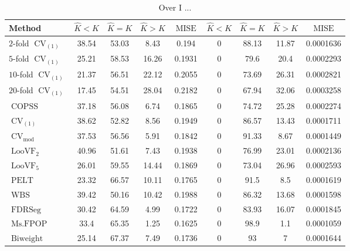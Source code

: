 \begin{table}[ht]
\centering
\begin{tabular}{|l|cccc|cccc|}
  \hline
Method & $\hat{K} < K$ & $\hat{K} = K$ & $\hat{K} > K$ & $\operatorname{MISE}$ & $\hat{K} < K$ & $\hat{K} = K$ & $\hat{K} > K$ & $\operatorname{MISE}$ \\ 
  \hline
$2$-fold $\operatorname{CV}_{(1)}$ & 38.54 & 53.03 &  8.43 & 0.194 &     0 & 88.13 & 11.87 & 0.0001636 \\ 
  $5$-fold $\operatorname{CV}_{(1)}$ & 25.21 & 58.53 & 16.26 & 0.1931 &     0 &  79.6 &  20.4 & 0.0002293 \\ 
  $10$-fold $\operatorname{CV}_{(1)}$ & 21.37 & 56.51 & 22.12 & 0.2055 &     0 & 73.69 & 26.31 & 0.0002821 \\ 
  $20$-fold $\operatorname{CV}_{(1)}$ & 17.45 & 54.51 & 28.04 & 0.2182 &     0 & 67.94 & 32.06 & 0.0003258 \\ 
  $\operatorname{COPSS}$ & 37.18 & 56.08 &  6.74 & 0.1865 &     0 & 74.72 & 25.28 & 0.0002274 \\ 
  $\operatorname{CV}_{(1)}$ & 38.62 & 52.82 &  8.56 & 0.1949 &     0 & 86.57 & 13.43 & 0.0001711 \\ 
  $\operatorname{CV}_{\operatorname{mod}}$ & 37.53 & 56.56 &  5.91 & 0.1842 &     0 & 91.33 &  8.67 & 0.0001449 \\ 
  $\operatorname{LooVF}_2$ & 40.96 & 51.61 &  7.43 & 0.1938 &     0 & 76.99 & 23.01 & 0.0002136 \\ 
  $\operatorname{LooVF}_5$ & 26.01 & 59.55 & 14.44 & 0.1869 &     0 & 73.04 & 26.96 & 0.0002593 \\ 
  $\operatorname{PELT}$ & 23.32 & 66.57 & 10.11 & 0.1765 &     0 &  91.5 &   8.5 & 0.0001619 \\ 
  $\operatorname{WBS}$ & 39.42 & 50.16 & 10.42 & 0.1988 &     0 & 86.32 & 13.68 & 0.0001598 \\ 
  $\operatorname{FDRSeg}$ & 30.42 & 64.59 &  4.99 & 0.1722 &     0 & 83.93 & 16.07 & 0.0001845 \\ 
  $\operatorname{Ms.FPOP}$ &  33.4 & 65.35 &  1.25 & 0.1625 &     0 &  98.9 &   1.1 & 0.0001059 \\ 
  $\operatorname{Biweight}$ & 25.14 & 67.37 &  7.49 & 0.1736 &     0 &    93 &     7 & 0.0001644 \\ 
   \hline
\end{tabular}
\caption{Over I ...} 
\end{table}
